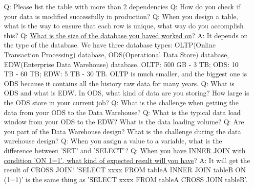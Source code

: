 \documentclass[a4paper,11pt]{article}
\begin{document}
\noindent 
Q: Please list the table with more than 2 dependencies \newline \newline
\noindent 
Q: How do you check if your data is modified successfully in production? \newline \newline
\noindent 
Q: When you design a table, what is the way to ensure that each row is unique, what way do you accomplish this? \newline \newline
\noindent 
Q: \ul{What is the size of the database you haved worked on}? \newline
A: It depends on the type of the database. We have three database types: OLTP(Online Transaction Processing) database, ODS(Operational Data Store) database, EDW(Enterprise Data Warehouse) database. OLTP: 500 GB - 3 TB; ODS: 10 TB - 60 TB; EDW: 5 TB - 30 TB. OLTP is much smaller, and the biggest one is ODS because it contains all the history raw data for many years.\newline \newline
\noindent 
Q: What is ODS and what is EDW. In ODS, what kind of data are you storing? How large is the ODS store in your current job?\newline \newline
\noindent 
Q: What is the challenge when getting the data from your ODS to the Data Warehouse?\newline \newline
\noindent 
Q: What is the typical data load window from your ODS to the EDW? What is the data loading volume?\newline \newline
\noindent 
Q: Are you part of the Data Warehouse design? What is the challenge during the data warehouse design?\newline \newline
\noindent 
Q: When you assign a value to a variable, what is the difference between 'SET' and 'SELECT'? \newline \newline
\noindent 
Q: \ul{When you have INNER JOIN with condition 'ON 1=1', what kind of expected result will you have}? \newline 
A: It will get the result of CROSS JOIN! 'SELECT xxxx FROM tableA INNER JOIN tableB ON (1=1)' is the same thing as 'SELECT xxxx FROM tableA CROSS JOIN tableB'. \newline \newline
\end{document}

